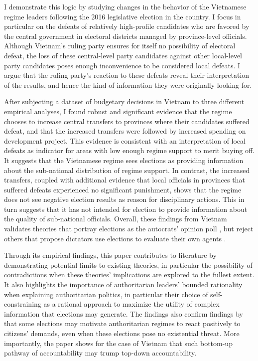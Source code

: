 \documentclass[12pt]{article}
\newcommand{\1}{\mathbbm{1}}
\begin{document}
I demonstrate this logic by studying changes in the behavior of the Vietnamese regime leaders following the 2016 legislative election in the country. I focus in particular on the defeats of relatively high-profile candidates who are favored by the central government in electoral districts managed by province-level officials. Although Vietnam's ruling party ensures for itself no possibility of electoral defeat, the loss of these central-level party candidates against other local-level party candidates poses enough inconvenience to be considered local defeats. I argue that the ruling party's reaction to these defeats reveal their interpretation of the results, and hence the kind of information they were originally looking for. 

After subjecting a dataset of budgetary decisions in Vietnam to three different empirical analyses, I found robust and significant evidence that the regime chooses to increase central transfers to provinces where their candidates suffered defeat, and that the increased transfers were followed by increased spending on development project. This evidence is consistent with an interpretation of local defeats as indicator for areas with low enough regime support to merit buying off. It suggests that the Vietnamese regime sees elections as providing information about the sub-national distribution of regime support. In contrast, the increased transfers, coupled with additional evidence that local officials in provinces that suffered defeats experienced no significant punishment, shows that the regime does not see negative election results as reason for disciplinary actions. This in turn suggests that it has not intended for election to provide information about the quality of sub-national officials. Overall, these findings from Vietnam validates theories that portray elections as the autocrats' opinion poll \citep[e.g.][]{Miller2015, Magaloni2006, Blaydes2008}, but reject others that propose dictators use elections to evaluate their own agents \citep[e.g.][prefix]{Magaloni2006, Blaydes2008,Myagkov2009,RundlettSvolik2016}.

Through its empirical findings, this paper contributes to literature by demonstrating potential limits to existing theories, in particular the possibility of contradictions when these theories' implications are explored to the fullest extent. It also highlights the importance of authoritarian leaders' bounded rationality when explaining authoritarian politics, in particular their choice of self-constraining as a rational approach to maximize the utility of complex information that elections may generate. The findings also confirm findings by \citet{Miller2015} that some elections may motivate authoritarian regimes to react positively to citizens' demands, even when these elections pose no existential threat. More importantly, the paper shows for the case of Vietnam that such bottom-up pathway of accountability may trump top-down accountability.
\end{document}
